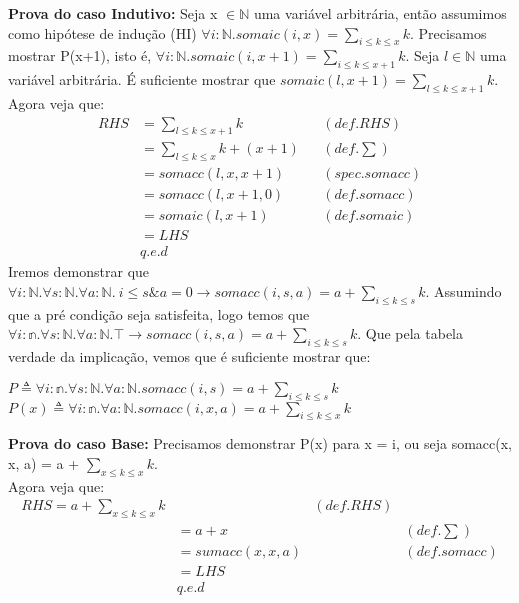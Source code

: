\documentclass{article}
\begin{document}
\textbf{Prova do caso Indutivo:} Seja x $\in \mathbb{N}$ uma variável arbitrária, então assumimos como hipótese
de indução (HI) $\forall i:\mathbb{N}. somaic(i, x) = \sum\limits_{i \le k \le x} k$. Precisamos mostrar P(x+1),
isto é, $\forall i:\mathbb{N}. somaic(i, x+1) = \sum\limits_{i \le k \le x+1} k$.
Seja $l \in \mathbb{N}$ uma variável arbitrária. É suficiente mostrar que
$somaic(l, x+1) = \sum\limits_{l \le k \le x+1} k$.\\
Agora veja que:\\
\begin{align*}
RHS &= \sum\limits_{l \le k \le x+1} k && (def. RHS)\\
&= \sum\limits_{l \le k \le x} k + (x +1) && (def. \sum) \\
&= somacc(l, x, x+1) && (spec. somacc)\\
&= somacc(l, x+1, 0) && (def. somacc)\\
&= somaic(l, x+1)	&& (def. somaic)\\
&= LHS\\
& q.e.d
\end{align*}
Iremos demonstrar que
$\forall i:\mathbb{N}. \forall s:\mathbb{N}. \forall a:\mathbb{N}.\:  i \leq s \& a = 0 \rightarrow somacc(i, s, a) = a + \sum\limits_{i \le k \le s} k$.
Assumindo que a pré condição seja satisfeita, logo temos que
$\forall i:\mathbb{n}. \forall s:\mathbb{N}. \forall a:\mathbb{N}. \top\rightarrow somacc(i, s, a) = a + \sum\limits_{i \le k \le s} k$.
Que pela tabela verdade da implicação, vemos que é suficiente mostrar que:
\begin{center}
$P \triangleq \forall i:\mathbb{n}. \forall s:\mathbb{N}. \forall a:\mathbb{N}. somacc(i, s) = a + \sum\limits_{i \le k \le s} k$
$P(x) \triangleq \forall i:\mathbb{n}. \forall a:\mathbb{N}. somacc(i, x, a) = a + \sum\limits_{i \le k \le x} k$
\end{center}
\textbf{Prova do caso Base:} Precisamos demonstrar P(x) para x = i, ou seja somacc(x, x, a) = a + $\sum\limits_{x \le k \le x} k$.\\
Agora veja que:
\begin{align*}
RHS = a + \sum\limits_{x \le k \le x} k && (def. RHS)\\
&= a + x && (def. \sum)\\
&= sumacc(x, x, a) && (def. somacc)\\
&= LHS\\
& q.e.d
\end{align*}
\end{document}
